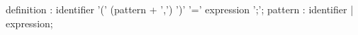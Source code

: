 \documentclass[11pt]{article}
\begin{document}
\begin{rail}
definition  : identifier '(' (pattern + ',')  ')' '=' expression ';';
pattern : identifier | expression; 
\end{rail}
\end{document}
